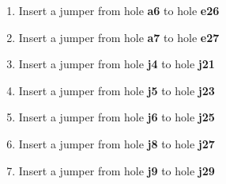 \begin{enumerate}

    \item Insert a jumper from hole \textbf{a6} to hole \textbf{e26}
    \item Insert a jumper from hole \textbf{a7} to hole \textbf{e27}
	\item Insert a jumper from hole \textbf{j4} to hole \textbf{j21}
    \item Insert a jumper from hole \textbf{j5} to hole \textbf{j23}
    \item Insert a jumper from hole \textbf{j6} to hole \textbf{j25}	
    \item Insert a jumper from hole \textbf{j8} to hole \textbf{j27}
    \item Insert a jumper from hole \textbf{j9} to hole \textbf{j29}
		
	

\end{enumerate}
